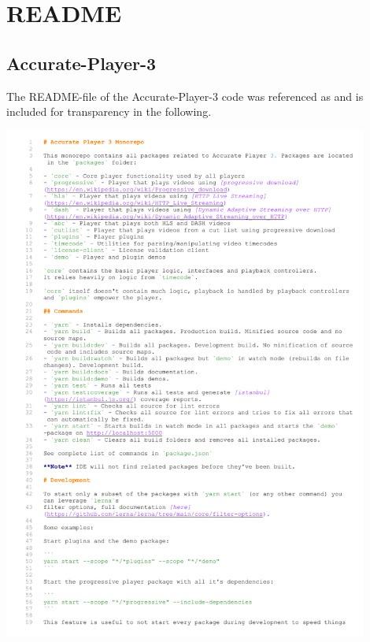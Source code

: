 \documentclass[12pt,a4paper]{article}
\begin{document}
	
	
	
	\newpage
	\begin{spacing}{1}
		\printbibliography
	\end{spacing}
	


\appendix

\newpage

\section{README} \label{appendix:readme}


\subsection{Accurate-Player-3} \label{appendix:readmeaccurateplayer}

The README-file of the Accurate-Player-3 code was referenced as \cite{RM_Frontend} and is included for transparency in the following.

\includegraphics[page=1, width=0.9\textwidth]{FE.pdf}
\end{document}
